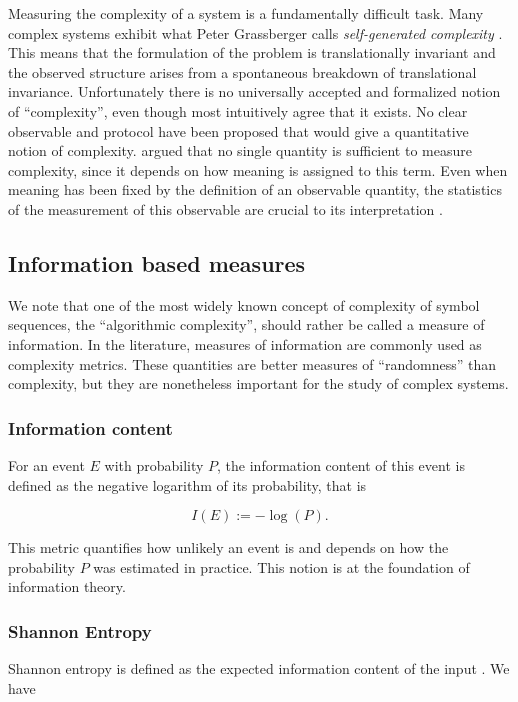 Measuring the complexity of a system is a fundamentally difficult task. Many
complex systems exhibit what Peter Grassberger calls \emph{self-generated
  complexity} \parencite{grassbergerQuantitativeTheorySelfgenerated1986}. This
means that the formulation of the problem is translationally invariant and the
observed structure arises from a spontaneous breakdown of translational
invariance. Unfortunately there is no universally accepted and formalized notion
of ``complexity'', even though most intuitively agree that it exists. No clear
observable and protocol have been proposed that would give a quantitative notion
of complexity. \textcite{grassbergerProblemsQuantifyingSelfgenerated1989} argued
that no single quantity is sufficient to measure complexity, since it depends on
how meaning is assigned to this term. Even when meaning has been fixed by the
definition of an observable quantity, the statistics of the measurement of this
observable are crucial to its interpretation
\parencite{gutowitzCellularAutomataSciences1995}.


\subsection{Information based measures}

We note that one of the most widely known concept of complexity of symbol
sequences, the ``algorithmic complexity'', should rather be called a measure of
information. In the literature, measures of information are commonly used as
complexity metrics. These quantities are better measures of ``randomness'' than
complexity, but they are nonetheless important for the study of complex systems.

\subsubsection{Information content}
For an event $E$ with probability $P$, the information content of this event is
defined as the negative logarithm of its probability, that is

\begin{equation}
  I(E) :=  -\log(P).
\end{equation}

This metric quantifies how unlikely an event is and depends on how the
probability $P$ was estimated in practice. This notion is at the foundation of
information theory.

\subsubsection{Shannon Entropy}
Shannon entropy is defined as the expected information content of the input
\parencite{shannonMathematicalTheoryCommunication1975}. We have

